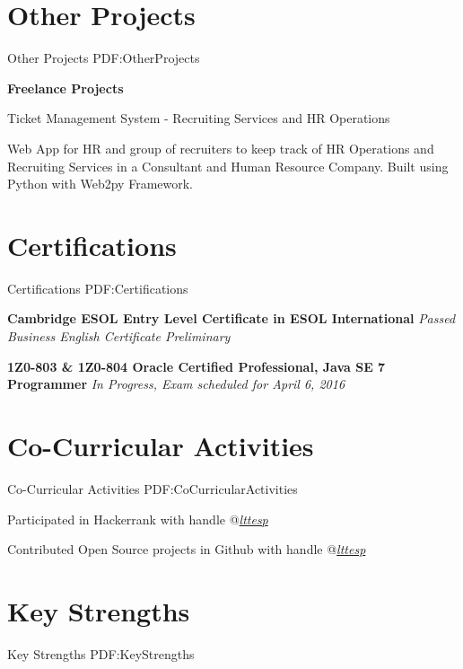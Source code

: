 \documentclass[letterpaper,MMMyyyy,nonstop]{simpleresumecv}
\begin{document}
\begin{body}
\section
{Other Projects}
{Other Projects}
{PDF:OtherProjects}

{\textbf{Freelance Projects}}

\GapNoBreak
\BulletItem
Ticket Management System - Recruiting Services and HR Operations
\begin{detail}
\SubBulletItem
Web App for HR and group of recruiters to keep track of HR Operations and Recruiting Services in a Consultant and Human Resource Company.
Built using Python with Web2py Framework.
\end{detail}


\section
{Certifications}
{Certifications}
{PDF:Certifications}


\BulletItem
\textbf{Cambridge ESOL Entry Level Certificate in ESOL International }
\newline
\emph {Passed Business English Certificate Preliminary}

\newline
\GapNoBreak
\BulletItem
\textbf{1Z0-803 \& 1Z0-804 Oracle Certified Professional, Java SE 7 Programmer }
\newline
\emph {In Progress, Exam scheduled for April 6, 2016}



\section
{Co-Curricular Activities}
{Co-Curricular Activities}
{PDF:CoCurricularActivities}


\GapNoBreak
\BulletItem
Participated in Hackerrank with handle @\href{http://hackerrank.com/lttesp} \emph{lttesp}

\GapNoBreak
\BulletItem
Contributed Open Source projects in Github with handle @\href{http://hackerrank.com/lttesp} \emph{lttesp}


\section
{Key Strengths}
{Key Strengths}
{PDF:KeyStrengths}


\end{body}
\end{document}
